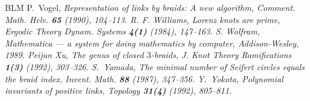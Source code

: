 {\begin{thebibliography}{BLM}
 P.~Vogel, \em{Representation of links by braids:
	A new algorithm}, Comment. Math. Helv. {\bf 65} (1990),
	104--113.
 R. F. Williams, \em{Lorenz knots are prime},
	Ergodic Theory Dynam. Systems  {\bf 4(1)} (1984), 147--163. 
 S. Wolfram, {\em Mathematica --- a system
	for doing mathematics by computer}, Addison-Wesley, 1989.
 Peijun Xu, {\em The genus of closed $3$-braids},
	J. Knot Theory Ramifications {\bf 1(3)} (1992), 303--326.
 S.~Yamada, \em{The minimal number of Seifert
	circles equals the braid index}, Invent. Math. {\bf 88}
	(1987), 347--356.
 Y.\ Yokota, {\em Polynomial invariants of
	positive links}, Topology {\bf 31(4)} (1992), 805--811.
\end{thebibliography}
}


 
